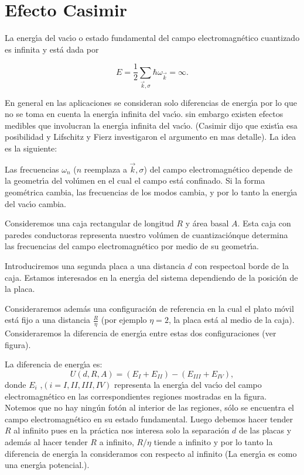 \section{Efecto Casimir}

La energ\'{\i}a del vac\'{\i}o o estado fundamental del campo
electromagn\'{e}tico cuantizado es infinita y est\'{a} dada por%

\begin{equation}
E=\frac{1}{2}\sum_{\vec{k},\sigma}\hbar\omega_{\vec{k}}=\infty. \label{cas1}
\end{equation}

En general en las aplicaciones se consideran solo diferencias de energ\'{\i}a
por lo que no se toma en cuenta la energ\'{\i}a infinita del vac\'{\i}o. sin
embargo existen efectos medibles que involucran la energ\'{\i}a infinita del
vac\'{\i}o. (Casimir dijo que exist\'{\i}a esa posibilidad y Lifschitz y Fierz
investigaron el argumento en mas detalle). La idea es la siguiente:

Las frecuencias $\omega_{n}$ ($n$ reemplaza a $\vec{k},\sigma$) del campo
electromagn\'{e}tico depende de la geometr\'{\i}a del vol\'{u}men en el cual
el campo est\'{a} confinado. Si la forma geom\'{e}trica cambia, las
frecuencias de los modos cambia, y por lo tanto la energ\'{\i}a del vac\'{\i}o
cambia.

Consideremos una caja rectangular de longitud $R$ y \'{a}rea basal $A$. Esta
caja con paredes conductoras representa nuestro vol\'{u}men de
cuantizaci\'{o}nque determina las frecuencias del campo electromagn\'{e}tico
por medio de su geometr\'{\i}a.

Introduciremos una segunda placa a una distancia $d$ con respectoal borde de
la caja. Estamos interesados en la energ\'{\i}a del sistema dependiendo de la
posici\'{o}n de la placa.

Consideraremos adem\'{a}s una configuraci\'{o}n de referencia en la cual el
plato m\'{o}vil est\'{a} fijo a una distancia $\frac{R}{\eta}$ (por ejemplo
$\eta=2$, la placa est\'{a} al medio de la caja). Consideraremos la diferencia
de energ\'{\i}a entre estas dos configuraciones (ver figura).


La diferencia de energ\'{\i}a es:
\begin{equation}
U\left(  d,R,A\right)  =\left(  E_{I}+E_{II}\right)  -\left(  E_{III}%
+E_{IV}\right)  , \label{cas2}%
\end{equation}
donde $E_{i}$ ,$(i=I,II,III,IV)$ representa la energ\'{\i}a del vac\'{\i}o del
campo electromagn\'{e}tico en las correspondientes regiones mostradas en la
figura. Notemos que no hay ning\'{u}n fot\'{o}n al interior de las regiones,
s\'{o}lo se encuentra el campo electromagn\'{e}tico en su estado fundamental.
Luego debemos hacer tender $R$ al infinito pues en la pr\'{a}ctica nos
interesa solo la separaci\'{o}n $d$ de las placas y adem\'{a}s al hacer tender
$R$ a infinito, $R/\eta$ tiende a infinito y por lo tanto la diferencia de
energ\'{\i}a la consideramos con respecto al infinito (La energ\'{\i}a es como
una energ\'{\i}a potencial.).

